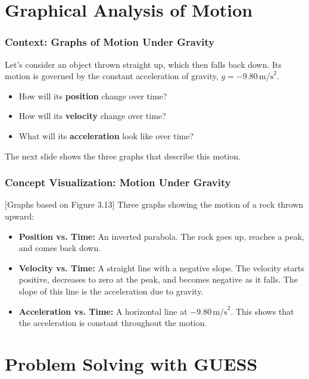 \documentclass{beamer}
\begin{document}
\section{Graphical Analysis of Motion}

\begin{frame}
\frametitle{Context: Graphs of Motion Under Gravity}
Let's consider an object thrown straight up, which then falls back down. Its motion is governed by the constant acceleration of gravity, $g = -9.80 \, \text{m/s}^2$.
\pause
\begin{itemize}
    \item How will its \textbf{position} change over time?
    \pause
    \item How will its \textbf{velocity} change over time?
    \pause
    \item What will its \textbf{acceleration} look like over time?
\end{itemize}
\pause
The next slide shows the three graphs that describe this motion.
\end{frame}

\begin{frame}
\frametitle{Concept Visualization: Motion Under Gravity}
\begin{alertblock}{[Graphs based on Figure 3.13]}
Three graphs showing the motion of a rock thrown upward:
\begin{itemize}
    \item \textbf{Position vs. Time:} An inverted parabola. The rock goes up, reaches a peak, and comes back down.
    \pause
    \item \textbf{Velocity vs. Time:} A straight line with a negative slope. The velocity starts positive, decreases to zero at the peak, and becomes negative as it falls. The slope of this line is the acceleration due to gravity.
    \pause
    \item \textbf{Acceleration vs. Time:} A horizontal line at $-9.80 \, \text{m/s}^2$. This shows that the acceleration is constant throughout the motion.
\end{itemize}
\end{alertblock}
\end{frame}

\section{Problem Solving with GUESS}
\end{document}

